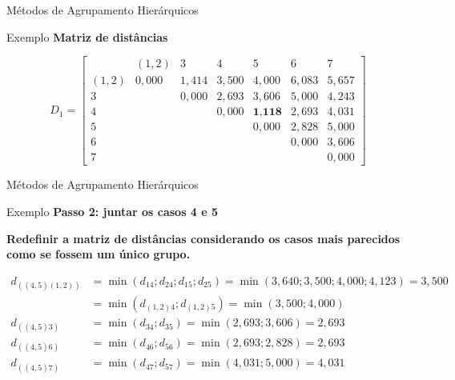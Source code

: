\documentclass[
  ignorenonframetext,
  aspectratio=169,
]{beamer}
\begin{document}
\begin{frame}{Métodos de Agrupamento Hierárquicos}
\label{muxe9todos-de-agrupamento-hieruxe1rquicos-18}
\begin{block}{Exemplo}
\label{exemplo-7}
\textbf{Matriz de distâncias}

\[D_1 = \left[ \begin{matrix}
&(1,2)&3&4&5&6&7\\ 
(1,2)& 0,000 & 1,414 & 3,500 & 4,000 & 6,083 & 5,657 \\
3  &  & 0,000 & 2,693 & 3,606 & 5,000 & 4,243 \\
4  &  &  & 0,000 & \textbf{1,118} & 2,693 & 4,031 \\
5 &  &  &  & 0,000 & 2,828 & 5,000 \\
6  &  &  &  &  & 0,000 & 3,606 \\
7  &  &  &  &  &  & 0,000
                    \end{matrix} \right]\]
\end{block}
\end{frame}

\begin{frame}{Métodos de Agrupamento Hierárquicos}
\label{muxe9todos-de-agrupamento-hieruxe1rquicos-19}
\begin{block}{Exemplo}
\label{exemplo-8}
\textbf{Passo 2: juntar os casos 4 e 5}

\textbf{Redefinir a matriz de distâncias considerando os casos mais
parecidos como se fossem um único grupo.}

\[
\begin{aligned}
d_{((4,5)(1,2))} &=  \min(d_{14};d_{24};d_{15};d_{25}) = \min(3,640; 3,500; 4,000; 4,123) = 3,500 \\ &= 
\min(d_{(1,2)4};d_{(1,2)5}) = \min(3,500;4,000) \\
d_{((4,5)3)} &=  \min(d_{34};d_{35}) = \min(2,693; 3,606) = 2,693 \\
d_{((4,5)6)} &=  \min(d_{46};d_{56}) = \min(2,693; 2,828) = 2,693 \\
d_{((4,5)7)} &=  \min(d_{47};d_{57}) = \min(4,031; 5,000) = 4,031 
\end{aligned}
\]
\end{block}
\end{frame}
\end{document}
